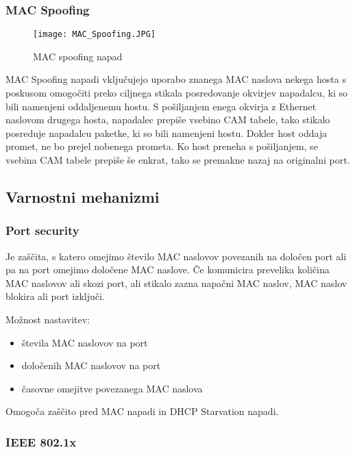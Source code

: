 \documentclass[12pt]{article}
\begin{document}
\subsubsection{MAC Spoofing}

\begin{figure}[htb]
\begin{center}
\texttt{[image: MAC\_Spoofing.JPG]}
\end{center}
\caption{MAC spoofing napad}
\label{mac_spoofing}
\end{figure}

MAC Spoofing napadi vključujejo uporabo znanega MAC naslova nekega hosta s poskusom omogočiti preko ciljnega stikala posredovanje okvirjev napadalcu, ki so bili namenjeni oddaljenemu hostu. S pošiljanjem enega okvirja z Ethernet naslovom drugega hosta, napadalec prepiše vsebino CAM tabele, tako stikalo posreduje napadalcu paketke, ki so bili namenjeni hostu. Dokler host oddaja promet, ne bo prejel nobenega prometa. Ko host preneha s pošiljanjem, se vsebina CAM tabele prepiše še enkrat, tako se premakne nazaj na originalni port.


\subsection{Varnostni mehanizmi}

\subsubsection{Port security}

Je zaščita, s katero omejimo število MAC naslovov povezanih na določen port ali pa na port omejimo določene MAC naslove. Če komunicira prevelika količina MAC naslovov ali skozi port, ali stikalo zazna napačni MAC naslov, MAC naslov blokira ali port izključi.

Možnost nastavitev:

\begin{itemize}
    \item števila MAC naslovov na port
    \item določenih MAC naslovov na port
    \item časovne omejitve povezanega MAC naslova 
\end{itemize}

Omogoča zaščito pred MAC napadi in DHCP Starvation napadi.


\subsubsection{IEEE 802.1x}
 
\end{document}
